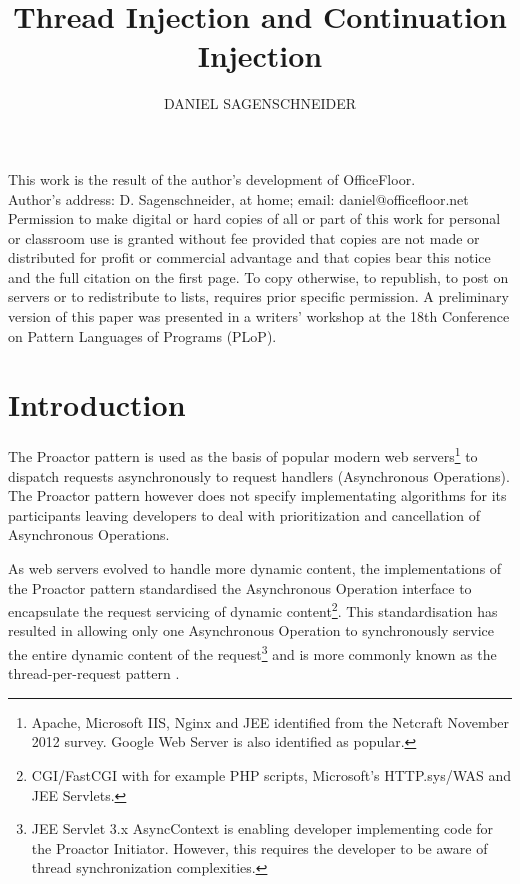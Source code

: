 \documentclass[prodmode]{style/acmlarge}
\title{Thread Injection and Continuation Injection}
\author{DANIEL SAGENSCHNEIDER \affil{daniel@officefloor.net}}
\begin{document}
\begin{bottomstuff}
This work is the result of the author's development of OfficeFloor.\\
Author's address: D. Sagenschneider, at home; email: daniel@officefloor.net\\

Permission to make digital or hard copies of all or part of this work for
personal or classroom use is granted without fee provided that copies are not
made or distributed for profit or commercial advantage and that copies bear this
notice and the full citation on the first page. To copy otherwise, to republish,
to post on servers or to redistribute to lists, requires prior specific
permission. A preliminary version of this paper was presented in a writers'
workshop at the 18th Conference on Pattern Languages of Programs (PLoP).
\end{bottomstuff}

\maketitle


\section{Introduction}

The Proactor pattern \cite{proactor} is used as the basis of popular modern web
servers\footnote{Apache, Microsoft IIS, Nginx and JEE identified from the
Netcraft November 2012 survey.  Google Web Server is also identified as
popular.} to dispatch requests asynchronously to request handlers (Asynchronous
Operations).  The Proactor pattern however does not specify implementating
algorithms for its participants leaving developers to deal with prioritization
and cancellation of Asynchronous Operations.

As web servers evolved to handle more dynamic content, the implementations of
the Proactor pattern standardised the Asynchronous Operation interface to
encapsulate the request servicing of dynamic content\footnote{CGI/FastCGI with
for example PHP scripts, Microsoft's HTTP.sys/WAS and JEE Servlets.}.  This
standardisation has resulted in allowing only one Asynchronous Operation to
synchronously service the entire dynamic content of the request\footnote{JEE Servlet 3.x
AsyncContext is enabling developer implementing code for the Proactor Initiator.
However, this requires the developer to be aware of thread synchronization
complexities.} and is more commonly known as the thread-per-request pattern
\cite{thread-per-request}.
\end{document}
